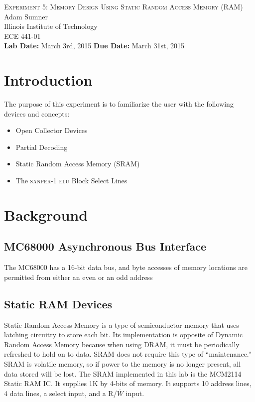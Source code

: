 \documentclass[12pt, twocolumn]{article}
\newcommand{\sanper}{\textsc{sanper-1 elu} }
\begin{document}
\begin{titlepage}
	\begin{center}
		
		
		\vfill
		
		\textsc{\LARGE Experiment 5: Memory Design Using Static Random Access Memory (RAM)}\\[1.5cm]
		
		\Large Adam Sumner\\[0.5cm]
		
		\Large Illinois Institute of Technology\\[0.5cm]
		
		\Large ECE 441-01\\[0.5cm]	
		\noindent
		\vfill
		\large \textbf{Lab Date:} March 3rd, 2015\hfill
		\large \textbf{Due Date:} March 31st, 2015
		
		
	\end{center}
\end{titlepage}

\section{Introduction}
The purpose of this experiment is to familiarize the user with the following devices and concepts:
\begin{itemize}
	\item Open Collector Devices
	\item Partial Decoding
	\item Static Random Access Memory (SRAM)
	\item The \sanper Block Select Lines
\end{itemize}

\section{Background}
\subsection{MC68000 Asynchronous Bus Interface}
The MC68000 has a 16-bit data bus, and byte accesses of memory locations are permitted from either an even or an odd address 
\subsection{Static RAM Devices}
Static Random Access Memory is a type of semiconductor memory that uses latching circuitry to store each bit. Its implementation is opposite of Dynamic Random Access Memory because when using DRAM, it must be periodically refreshed to hold on to data. SRAM does not require this type of ``maintenance." SRAM is volatile memory, so if power to the memory is no longer present, all data stored will be lost. The SRAM implemented in this lab is the MCM2114 Static RAM IC. It supplies 1K by 4-bits of memory. It supports 10 address lines, 4 data lines, a select input, and a R/$\overline{W}$ input.
\end{document}
